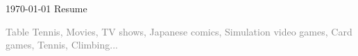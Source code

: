 \documentclass[11pt, a4paper]{awesome-cv}
\begin{document}
\makecvheader[L]

\makecvfooter
  {\today}
  {Resume}
  {\thepage}





\newpage




\textcolor{gray}{\hspace{1cm} Table Tennis, Movies, TV shows, Japanese comics, Simulation video games, Card games, Tennis, Climbing...}
      



\end{document}
